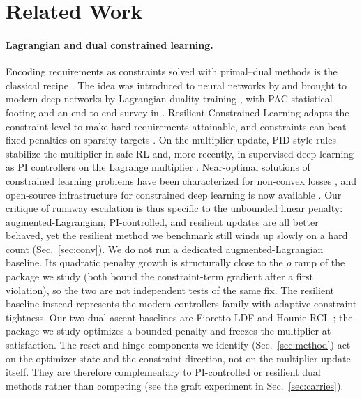\documentclass[10pt]{article}
\begin{document}
\section{Related Work}
\label{sec:related}

\paragraph{Lagrangian and dual constrained learning.}
Encoding requirements as constraints solved with primal--dual methods is
the classical recipe \citep{bertsekas1982constrained}. The idea was
introduced to neural networks by \citet{platt1988constrained} and brought
to modern deep networks by Lagrangian-duality training
\citep{fioretto2020lagrangian}, with PAC statistical footing
\citep{chamon2020probably,chamon2022constrained} and an end-to-end survey
in \citet{kotary2021end}. Resilient Constrained Learning
\citep{hounie2023resilient} adapts the constraint level to make hard
requirements attainable, and constraints can beat fixed penalties on
sparsity targets \citep{gallego2022controlled}. On the multiplier update,
PID-style rules stabilize the multiplier in safe RL
\citep{stooke2020responsive} and, more recently, in supervised deep
learning as PI controllers on the Lagrange multiplier
\citep{sohrabi2024pi}. Near-optimal solutions of constrained learning
problems have been characterized for non-convex losses
\citep{elenter2024near}, and open-source infrastructure for constrained
deep learning is now available \citep{gallego2024cooper}. Our critique of
runaway escalation is thus specific to the unbounded linear penalty:
augmented-Lagrangian, PI-controlled, and resilient updates are all better
behaved, yet the resilient method we benchmark still winds up slowly on a
hard count (Sec.~\ref{sec:conv}). We do not run a dedicated
augmented-Lagrangian baseline. Its quadratic penalty growth is
structurally close to the $\rho$ ramp of the package we study (both bound
the constraint-term gradient after a first violation), so the two are not
independent tests of the same fix. The resilient baseline instead
represents the modern-controllers family with adaptive constraint
tightness. Our two dual-ascent baselines are Fioretto-LDF
\citep{fioretto2020lagrangian} and Hounie-RCL \citep{hounie2023resilient};
the package we study optimizes a bounded penalty and freezes the
multiplier at satisfaction. The reset and hinge components we identify
(Sec.~\ref{sec:method}) act on the optimizer state and the constraint
direction, not on the multiplier update itself. They are therefore
complementary to PI-controlled or resilient dual methods rather than
competing (see the graft experiment in Sec.~\ref{sec:carries}).
\end{document}
